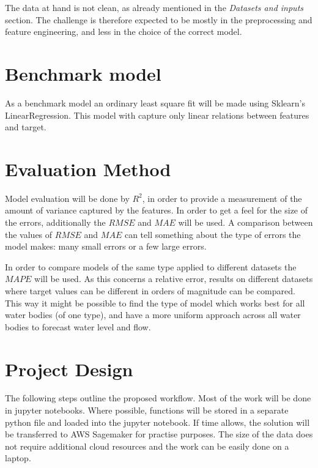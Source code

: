 \documentclass[11pt]{article}
\begin{document}
The data at hand is not clean, as already mentioned in the \emph{Datasets and inputs} section. The challenge is therefore expected to be mostly in the preprocessing and feature engineering, and less in the choice of the correct model. 

\section{Benchmark model}

As a benchmark model an ordinary least square fit will be made using Sklearn's LinearRegression. This model with capture only linear relations between features and target.

\section{Evaluation Method}

Model evaluation will be done by $R^2$, in order to provide a measurement of the amount of variance captured by the features. In order to get a feel for the size of the errors, additionally the $RMSE$ and $MAE$ will be used. A comparison between the values of $RMSE$ and $MAE$ can tell something about the type of errors the model makes: many small errors or a few large errors. 

In order to compare models of the same type applied to different datasets the $MAPE$ will be used. As this concerns a relative error, results on different datasets where target values can be different in orders of magnitude can be compared. This way it might be possible to find the type of model which works best for all water bodies (of one type), and have a more uniform approach across all water bodies to forecast water level and flow.


\section{Project Design}

The following steps outline the proposed workflow. Most of the work will be done in jupyter notebooks. Where possible, functions will be stored in a separate python file and loaded into the jupyter notebook. If time allows, the solution will be transferred to AWS Sagemaker for practise purposes. The size of the data does not require additional cloud resources and the work can be easily done on a laptop.
\end{document}
